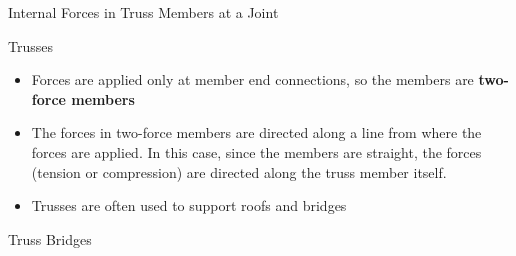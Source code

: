 \documentclass[9pt, xcolor={svgnames, x11names},professionalfonts]{beamer}
\def\scale{1}
\begin{document}


\begin{frame}{Internal Forces in Truss Members at a Joint}
	\def\scale{0.85}
	\centering
	
	

\end{frame}


\begin{frame}{Trusses}
	\def\scale{0.65}

	\begin{center}
		
	\end{center}

	\begin{itemize}
		\item Forces are applied only at member end connections, so the members are \textbf{two-force members}\parm
		\item The forces in two-force members are directed along a line from where the forces are applied. In this case, since the members are straight, the forces (tension or compression) are directed along the truss member itself.\parm
		\item Trusses are often used to support roofs and bridges
	\end{itemize}

\end{frame}


\begin{frame}{Truss Bridges}
\end{frame}
\end{document}
